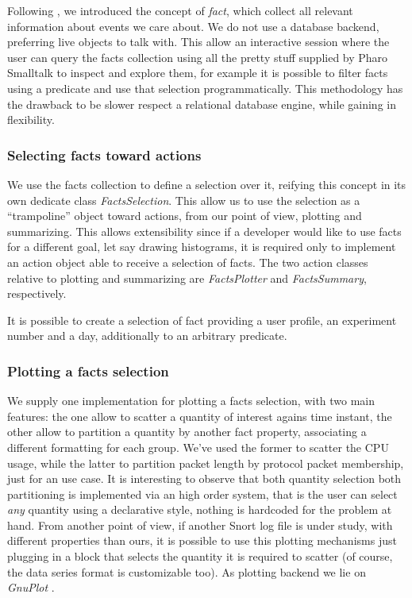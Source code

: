 \documentclass[10pt,a4paper]{article}
\begin{document}
    Following \cite{bondavalli}, we introduced the concept of
    \emph{fact}, which collect all relevant information about events
    we care about. We do not use a database backend, preferring live
    objects to talk with. This allow an interactive session where the
    user can query the facts collection using all the pretty stuff
    supplied by Pharo Smalltalk to inspect and explore them, for
    example it is possible to filter facts using a predicate and use
    that selection programmatically. This methodology has the drawback
    to be slower respect a relational database engine, while gaining
    in flexibility.

    \subsubsection{Selecting facts toward actions}
    
    We use the facts collection to define a selection over it,
    reifying this concept in its own dedicate class
    \emph{FactsSelection}. This allow us to use the selection as a
    ``trampoline'' object \cite{weiher-ducasse} toward actions, from
    our point of view, plotting and summarizing. This allows
    extensibility since if a developer would like to use facts for a
    different goal, let say drawing histograms, it is required only to
    implement an action object able to receive a selection of
    facts. The two action classes relative to plotting and summarizing
    are \emph{FactsPlotter} and \emph{FactsSummary}, respectively. 

    It is possible to create a selection of fact providing a user
    profile, an experiment number and a day, additionally to an
    arbitrary predicate.

    \subsubsection{Plotting a facts selection}

    We supply one implementation for plotting a facts selection, with
    two main features: the one allow to scatter a quantity of interest
    agains time instant, the other allow to partition a quantity by
    another fact property, associating a different formatting for each
    group. We've used the former to scatter the CPU usage, while the
    latter to partition packet length by protocol packet membership,
    just for an use case. It is interesting to observe that both
    quantity selection both partitioning is implemented via an high
    order system, that is the user can select \emph{any} quantity
    using a declarative style, nothing is hardcoded for the problem at
    hand. From another point of view, if another Snort log file is
    under study, with different properties than ours, it is possible
    to use this plotting mechanisms just plugging in a block that
    selects the quantity it is required to scatter (of course, the
    data series format is customizable too). As plotting backend we
    lie on \emph{GnuPlot} \cite{gnuplot}.
\end{document}
